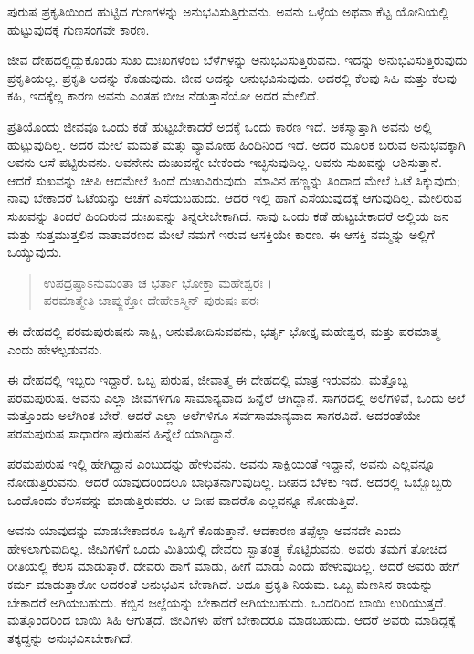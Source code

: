{\small ಪುರುಷ ಪ್ರಕೃತಿಯಿಂದ ಹುಟ್ಟಿದ ಗುಣಗಳನ್ನು ಅನುಭವಿಸುತ್ತಿರುವನು. ಅವನು ಒಳ್ಳೆಯ ಅಥವಾ ಕೆಟ್ಟ ಯೋನಿಯಲ್ಲಿ ಹುಟ್ಟುವುದಕ್ಕೆ ಗುಣಸಂಗವೇ ಕಾರಣ.}

ಜೀವ ದೇಹದಲ್ಲಿದ್ದುಕೊಂಡು ಸುಖ ದುಃಖಗಳೆಂಬ ಬೆಳೆಗಳನ್ನು ಅನುಭವಿಸುತ್ತಿರುವನು. ಇದನ್ನು ಅನುಭವಿಸುತ್ತಿರುವುದು ಪ್ರಕೃತಿಯಲ್ಲ. ಪ್ರಕೃತಿ ಅದನ್ನು ಕೊಡುವುದು. ಜೀವ ಅದನ್ನು ಅನುಭವಿಸುವುದು. ಅದರಲ್ಲಿ ಕೆಲವು ಸಿಹಿ ಮತ್ತು ಕೆಲವು ಕಹಿ, ಇದಕ್ಕೆಲ್ಲ ಕಾರಣ ಅವನು ಎಂತಹ ಬೀಜ ನೆಡುತ್ತಾನೆಯೋ ಅದರ ಮೇಲಿದೆ.

ಪ್ರತಿಯೊಂದು ಜೀವವೂ ಒಂದು ಕಡೆ ಹುಟ್ಟಬೇಕಾದರೆ ಅದಕ್ಕೆ ಒಂದು ಕಾರಣ ಇದೆ. ಅಕಸ್ಮಾತ್ತಾಗಿ ಅವನು ಅಲ್ಲಿ ಹುಟ್ಟುವುದಿಲ್ಲ. ಅದರ ಮೇಲೆ ಮಮತೆ ಮತ್ತು ವ್ಯಾಮೋಹ ಹಿಂದಿನಿಂದ ಇದೆ. ಅದರ ಮೂಲಕ ಬರುವ ಅನುಭವಕ್ಕಾಗಿ ಅವನು ಆಸೆ ಪಟ್ಟಿರುವನು. ಅವನೇನು ದುಃಖವನ್ನೇ ಬೇಕೆಂದು ಇಚ್ಛಿಸುವುದಿಲ್ಲ. ಅವನು ಸುಖವನ್ನು ಆಶಿಸುತ್ತಾನೆ. ಆದರೆ ಸುಖವನ್ನು ಚೀಪಿ ಆದಮೇಲೆ ಹಿಂದೆ ದುಃಖವಿರುವುದು. ಮಾವಿನ ಹಣ್ಣನ್ನು ತಿಂದಾದ ಮೇಲೆ ಓಟೆ ಸಿಕ್ಕುವುದು; ನಾವು ಬೇಕಾದರೆ ಓಟೆಯನ್ನು ಆಚೆಗೆ ಎಸೆಯಬಹುದು. ಆದರೆ ಇಲ್ಲಿ ಹಾಗೆ ಎಸೆಯುವುದಕ್ಕೆ ಆಗುವುದಿಲ್ಲ. ಮೇಲಿರುವ ಸುಖವನ್ನು ತಿಂದರೆ ಹಿಂದಿರುವ ದುಃಖವನ್ನು ತಿನ್ನಲೇಬೇಕಾಗಿದೆ. ನಾವು ಒಂದು ಕಡೆ ಹುಟ್ಟಬೇಕಾದರೆ ಅಲ್ಲಿಯ ಜನ ಮತ್ತು ಸುತ್ತಮುತ್ತಲಿನ ವಾತಾವರಣದ ಮೇಲೆ ನಮಗೆ ಇರುವ ಆಸಕ್ತಿಯೇ ಕಾರಣ. ಈ ಆಸಕ್ತಿ ನಮ್ಮನ್ನು ಅಲ್ಲಿಗೆ ಒಯ್ಯುವುದು.

\begin{verse}
ಉಪದ್ರಷ್ಟಾಽನುಮಂತಾ ಚ ಭರ್ತಾ ಭೋಕ್ತಾ ಮಹೇಶ್ವರಃ ।\\ಪರಮಾತ್ಮೇತಿ ಚಾಪ್ಯುಕ್ತೋ ದೇಹೇಽಸ್ಮಿನ್ ಪುರುಷಃ ಪರಃ 
\end{verse}

{\small ಈ ದೇಹದಲ್ಲಿ ಪರಮಪುರುಷನು ಸಾಕ್ಷಿ, ಅನುಮೋದಿಸುವವನು, ಭರ್ತೃ ಭೋಕ್ತೃ ಮಹೇಶ್ವರ, ಮತ್ತು ಪರಮಾತ್ಮ ಎಂದು ಹೇಳಲ್ಪಡುವನು.}

ಈ ದೇಹದಲ್ಲಿ ಇಬ್ಬರು ಇದ್ದಾರೆ. ಒಬ್ಬ ಪುರುಷ, ಜೀವಾತ್ಮ ಈ ದೇಹದಲ್ಲಿ ಮಾತ್ರ ಇರುವನು. ಮತ್ತೊಬ್ಬ ಪರಮಪುರುಷ. ಅವನು ಎಲ್ಲಾ ಜೀವಗಳಿಗೂ ಸಾಮಾನ್ಯವಾದ ಹಿನ್ನೆಲೆ ಆಗಿದ್ದಾನೆ. ಸಾಗರದಲ್ಲಿ ಅಲೆಗಳಿವೆ, ಒಂದು ಅಲೆ ಮತ್ತೊಂದು ಅಲೆಗಿಂತ ಬೇರೆ. ಆದರೆ ಎಲ್ಲಾ ಅಲೆಗಳಿಗೂ ಸರ್ವಸಾಮಾನ್ಯವಾದ ಸಾಗರವಿದೆ. ಅದರಂತೆಯೇ ಪರಮಪುರುಷ ಸಾಧಾರಣ ಪುರುಷನ ಹಿನ್ನೆಲೆ ಯಾಗಿದ್ದಾನೆ.

ಪರಮಪುರುಷ ಇಲ್ಲಿ ಹೇಗಿದ್ದಾನೆ ಎಂಬುದನ್ನು ಹೇಳುವನು. ಅವನು ಸಾಕ್ಷಿಯಂತೆ ಇದ್ದಾನೆ, ಅವನು ಎಲ್ಲವನ್ನೂ ನೋಡುತ್ತಿರುವನು. ಆದರೆ ಯಾವುದರಿಂದಲೂ ಬಾಧಿತನಾಗುವುದಿಲ್ಲ. ದೀಪದ ಬೆಳಕು ಇದೆ. ಅದರಲ್ಲಿ ಒಬ್ಬೊಬ್ಬರು ಒಂದೊಂದು ಕೆಲಸವನ್ನು ಮಾಡುತ್ತಿರುವರು. ಆ ದೀಪ ವಾದರೊ ಎಲ್ಲವನ್ನೂ ನೋಡುತ್ತಿದೆ.

ಅವನು ಯಾವುದನ್ನು ಮಾಡಬೇಕಾದರೂ ಒಪ್ಪಿಗೆ ಕೊಡುತ್ತಾನೆ. ಆದಕಾರಣ ತಪ್ಪೆಲ್ಲಾ ಅವನದೇ ಎಂದು ಹೇಳಲಾಗುವುದಿಲ್ಲ. ಜೀವಿಗಳಿಗೆ ಒಂದು ಮಿತಿಯಲ್ಲಿ ದೇವರು ಸ್ವಾತಂತ್ರ್ಯ ಕೊಟ್ಟಿರುವನು. ಅವರು ತಮಗೆ ತೋಚಿದ ರೀತಿಯಲ್ಲಿ ಕೆಲಸ ಮಾಡುತ್ತಾರೆ. ದೇವರು ಹಾಗೆ ಮಾಡು, ಹೀಗೆ ಮಾಡು ಎಂದು ಹೇಳುವುದಿಲ್ಲ. ಆದರೆ ಅವರು ಹೇಗೆ ಕರ್ಮ ಮಾಡುತ್ತಾರೋ ಅದರಂತೆ ಅನುಭವಿಸ ಬೇಕಾಗಿದೆ. ಅದೂ ಪ್ರಕೃತಿ ನಿಯಮ. ಒಬ್ಬ ಮೆಣಸಿನ ಕಾಯನ್ನು ಬೇಕಾದರೆ ಅಗಿಯಬಹುದು. ಕಬ್ಬಿನ ಜಲ್ಲೆಯನ್ನು ಬೇಕಾದರೆ ಅಗಿಯಬಹುದು. ಒಂದರಿಂದ ಬಾಯಿ ಉರಿಯುತ್ತದೆ. ಮತ್ತೊಂದರಿಂದ ಬಾಯಿ ಸಿಹಿ ಆಗುತ್ತದೆ. ಜೀವಿಗಳು ಹೇಗೆ ಬೇಕಾದರೂ ಮಾಡಬಹುದು. ಆದರೆ ಅವರು ಮಾಡಿದ್ದಕ್ಕೆ ತಕ್ಕದ್ದನ್ನು ಅನುಭವಿಸಬೇಕಾಗಿದೆ.

